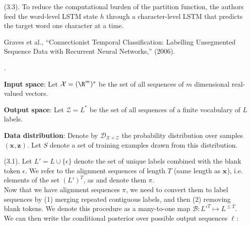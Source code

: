 \documentclass[11pt]{article}
\renewcommand\vec[2][]{\bm{#2}_{#1}}
\newcommand\myspace[1][]{\vspace{#1\bigskipamount}}
\newcommand\p{\Needspace{10\baselineskip} \noindent}
\begin{document}
\myspace
\p {} (3.3). To reduce the computational burden of the partition function, the authors feed the word-level LSTM state $h$ through a character-level LSTM that predicts the target word one character at a time.













\vspace{-1em}
{\footnotesize Graves et al., ``Connectionist Temporal Classification: Labelling Unsegmented Sequence Data with Recurrent Neural Networks,'' (2006).}

\p {}.

\begin{compactitem}
	\item \textbf{Input space}: Let $\mathcal X = (\R^m)^*$ be the set of all sequences of $m$ dimensional real-valued vectors. 
	
	\item \textbf{Output space}: Let $\mathcal{Z} = L^*$ be the set of all sequences of a finite vocabulary of $L$ labels. 
	
	\item \textbf{Data distribution}: Denote by $\mathcal{D}_{\mathcal X \times \mathcal Z}$ the probability distribution over samples $(\vec x, \vec z)$. Let $S$ denote a set of training examples drawn from this distribution. 
\end{compactitem}

\myspace
\p {} (3.1). Let $L' = L \cup \{ \epsilon \}$ denote the set of unique labels combined with the blank token $\epsilon$. We refer to the alignment sequences of length $T$ (same length as $\vec x$), i.e. elements of the set $(L')^T$, as  and denote them $\pi$. \\

\p Now that we have alignment sequences $\pi$, we need to convert them to label sequences by (1) merging repeated contiguous labels, and then (2) removing blank tokens. We denote this procedure as a many-to-one map $\mathcal{B} : L'^T \mapsto L^{\le T}$. We can then write the conditional posterior over possible output sequences $\vec\ell$:
\graybox{
	p(\vec\ell \mid \vec x)
		&= \sum_{\pi \in \mathcal{B}^{-1}(\vec\ell)} p(\pi \mid \vec x)
}
\end{document}

